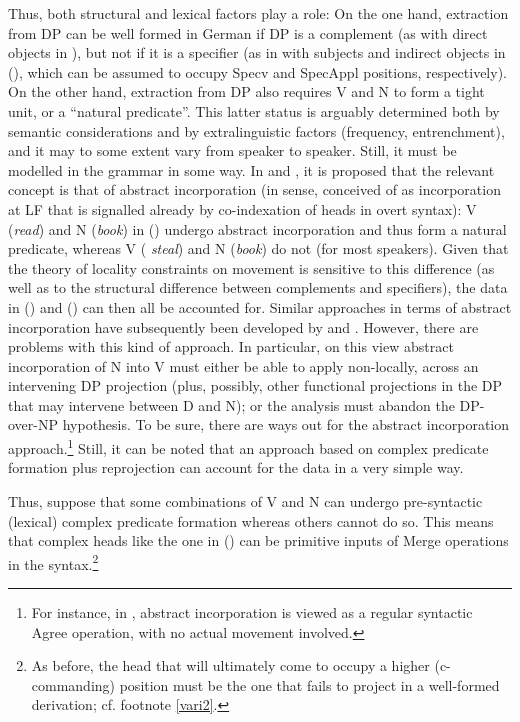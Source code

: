 \documentclass[output=paper
,modfonts
,nonflat]{langsci/langscibook}
\begin{document}
Thus, both structural and lexical factors play a role: On the one
hand, extraction from DP can be well formed in German if DP is a complement
(as with direct objects in \Last[ab]), but not if it is a specifier (as in
with subjects and indirect objects in (\LLast[a--b]), which can be assumed
to occupy Specv and SpecAppl positions, respectively). On the other
hand, extraction from DP also requires V and N to form a tight unit,
or a ``natural predicate''. This latter status is arguably determined
both by semantic considerations and by extralinguistic factors
(frequency, entrenchment), and it may to some extent vary from speaker
to speaker. Still, it must be modelled in the grammar in some way. In
\cite{Mueller:91:abs} and \cite{Mueller&Sternefeld:95}, it is proposed
that the relevant concept is that of abstract incorporation (in
 sense, conceived of as incorporation at LF that
is signalled already by co-indexation of heads in overt syntax): V
({\itshape read}) and N ({\itshape book}) in (\Last[a]) undergo abstract
incorporation and thus form a natural predicate, whereas V ({\it
  steal}) and N ({\itshape book}) do not (for most speakers). Given that
the theory of locality constraints on movement is sensitive to this
difference (as well as to the structural difference between
complements and specifiers), the data in (\LLast) and (\Last) can then all
be accounted for. Similar approaches in terms of abstract
incorporation have subsequently been developed by
\cite{Davies&Dubinsky:03} and \cite{Schmellentin:06}. However, there
are problems with this kind of approach. In particular, on this view
abstract incorporation of N into V must either be able to apply
non-locally, across an intervening DP projection (plus, possibly,
other functional projections in the DP that may intervene between D
and N); or the analysis must abandon the DP-over-NP hypothesis. To be
sure, there are ways out for the abstract incorporation
approach.\footnote{For instance, in \cite{Mueller:11:loc}, abstract incorporation is
  viewed as a regular syntactic Agree operation, with no actual
  movement involved.} Still, it can be noted that an approach based on
complex predicate formation plus reprojection can account for the data
in a very simple way. 

Thus, suppose that some combinations of V and N can undergo
pre-syntactic (lexical) complex predicate formation whereas others
cannot do so. This means that complex heads like the one in (\Next) can
be primitive inputs of Merge operations in the syntax.\footnote{As
  before, the head that will ultimately come to occupy a higher
  (c-commanding) position must be the one that fails to project in a
  well-formed derivation; cf. footnote \ref{vari2}.}
\end{document}
